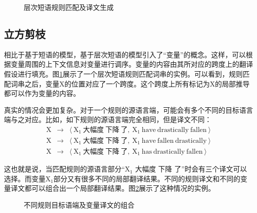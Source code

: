 
\begin{figure}[htp]
\centering

\caption{层次短语规则匹配及译文生成}
\label{fig:4-38}
\end{figure}

\subsection{立方剪枝}

\parinterval 相比于基于短语的模型，基于层次短语的模型引入了``变量''的概念。这样，可以根据变量周围的上下文信息对变量进行调序。变量的内容由其所对应的跨度上的翻译假设进行填充。图\ref{fig:4-38}展示了一个层次短语规则匹配词串的实例。可以看到，规则匹配词串之后，变量X的位置对应了一个跨度。这个跨度上所有标记为X的局部推导都可以作为变量的内容。


\parinterval 真实的情况会更加复杂。对于一个规则的源语言端，可能会有多个不同的目标语言端与之对应。比如，如下规则的源语言端完全相同，但是译文不同：
\begin{eqnarray}
\textrm{X} & \to & \langle\ \textrm{X}_1\ \text{大幅度}\ \text{下降}\ \text{了},\ \textrm{X}_1\ \textrm{have}\ \textrm{drastically}\ \textrm{fallen}\ \rangle \nonumber \\
\textrm{X} & \to & \langle\ \textrm{X}_1\ \text{大幅度}\ \text{下降}\ \text{了},\ \textrm{X}_1\ \textrm{have}\ \textrm{fallen}\ \textrm{drastically}\ \rangle \nonumber \\
\textrm{X} & \to & \langle\ \textrm{X}_1\ \text{大幅度}\ \text{下降}\ \text{了},\ \textrm{X}_1\ \textrm{has}\ \textrm{drastically}\ \textrm{fallen}\ \rangle \nonumber
\end{eqnarray}

\parinterval 这也就是说，当匹配规则的源语言部分``$\textrm{X}_1$ 大幅度 下降 了''时会有三个译文可以选择。而变量$\textrm{X}_1$部分又有很多不同的局部翻译结果。不同的规则译文和不同的变量译文都可以组合出一个局部翻译结果。图\ref{fig:4-39}展示了这种情况的实例。

\begin{figure}[htp]
\centering

\caption{不同规则目标语端及变量译文的组合}
\label{fig:4-39}
\end{figure}

